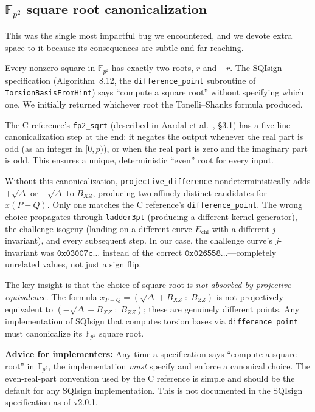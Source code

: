 \subsection{\texorpdfstring{$\mathbb{F}_{p^2}$}{Fp2} square root canonicalization}
\label{sec:bug-sqrt}

This was the single most impactful bug we encountered, and we devote
extra space to it because its consequences are subtle and far-reaching.

Every nonzero square in $\mathbb{F}_{p^2}$ has exactly two roots,
$r$ and $-r$.  The SQIsign specification (Algorithm~8.12, the
\texttt{difference\_point} subroutine of \texttt{TorsionBasisFromHint})
says ``compute a square root'' without specifying which one.  We
initially returned whichever root the Tonelli--Shanks formula
produced.

The C reference's \texttt{fp2\_sqrt} (described in Aardal et
al.~\cite{ABCDK24}, \S3.1) has a five-line canonicalization step at
the end: it negates the output whenever the real part is odd (as an
integer in $[0, p)$), or when the real part is zero and the imaginary
part is odd.  This ensures a unique, deterministic ``even'' root for
every input.

Without this canonicalization, \texttt{projective\_difference}
nondeterministically adds $+\sqrt{\Delta}$ or $-\sqrt{\Delta}$ to
$B_{XZ}$, producing two affinely distinct candidates for
$x(P-Q)$.  Only one matches the C reference's
\texttt{difference\_point}.  The wrong choice propagates through
\texttt{ladder3pt} (producing a different kernel generator), the
challenge isogeny (landing on a different curve $E_{\text{chl}}$
with a different $j$-invariant), and every subsequent step.  In our
case, the challenge curve's $j$-invariant was $\mathtt{0x03007c\ldots}$
instead of the correct $\mathtt{0x026558\ldots}$---completely unrelated
values, not just a sign flip.

The key insight is that the choice of square root is \emph{not absorbed
by projective equivalence}.  The formula
$x_{P-Q} = (\sqrt{\Delta} + B_{XZ} \;:\; B_{ZZ})$
is not projectively equivalent to
$(-\sqrt{\Delta} + B_{XZ} \;:\; B_{ZZ})$;
these are genuinely different points.  Any implementation of SQIsign
that computes torsion bases via \texttt{difference\_point} must
canonicalize its $\mathbb{F}_{p^2}$ square root.

\noindent
\textbf{Advice for implementers:}  Any time a specification says ``compute a square
root'' in $\mathbb{F}_{p^2}$, the implementation \emph{must} specify
and enforce a canonical choice.  The even-real-part convention used by
the C reference is simple and should be the default for any SQIsign
implementation.  This is not documented in the SQIsign specification
as of v2.0.1.

